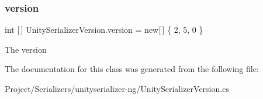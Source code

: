 \subsubsection{\texorpdfstring{version}{version}}
{\footnotesize\ttfamily int \mbox{[}$\,$\mbox{]} Unity\+Serializer\+Version.\+version = new\mbox{[}$\,$\mbox{]} \{ 2, 5, 0 \}\hspace{0.3cm}{\ttfamily [static]}}



The version 



The documentation for this class was generated from the following file\+:\begin{DoxyCompactItemize}
\item 
Project/\+Serializers/unityserializer-\/ng/Unity\+Serializer\+Version.\+cs\end{DoxyCompactItemize}
